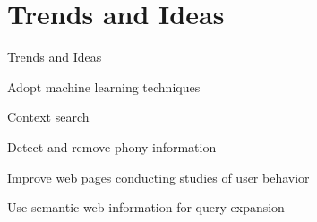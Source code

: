 \section{Trends and Ideas}

\begin{frame}{Trends and Ideas}

Adopt machine learning techniques \newline

Context search \newline

Detect and remove phony information \newline

Improve web pages conducting studies of user behavior \newline

Use semantic web information for query expansion \newline

\end{frame}
